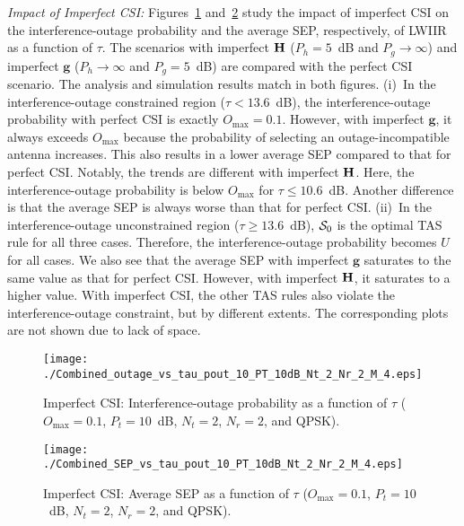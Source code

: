 \documentclass[journal]{IEEEtran}
\newcommand{\tendsto}{\to}
\newcommand{\mtx}[1]{{\bf #1}} %
\newcommand{\Nt}{{N_t}}
\newcommand{\Nr}{{N_r}}
\newcommand{\Pt}{{P_t}}
\newcommand{\puch}{g}
\newcommand{\g}{\mathbf{\puch}}
\newcommand{\outmax}{O_{\text{max}}}
\newcommand{\itau}{\tau}
\newcommand{\un}{U}
\newcommand{\Hmx}{\mtx{H}}
\newcommand{\caluncons}{{\cal S_{\text{0}}}}
\newcommand{\gpilotpower}{P_g}
\newcommand{\hpilotpower}{P_h}
\begin{document}
{\em Impact of Imperfect CSI:} Figures~\ref{fig:out_vs_tau_imp_CSI} and~\ref{fig:sep_vs_tau_imp_CSI} study the impact of imperfect CSI on the interference-outage probability and the average SEP, respectively, of LWIIR as a function of $\tau$. The scenarios with imperfect $\Hmx$ ($\hpilotpower=5$~dB and $\gpilotpower\tendsto\infty$) and imperfect $\g$ ($\hpilotpower\tendsto\infty$ and $\gpilotpower=5$~dB) are compared with the perfect CSI scenario. The analysis and  simulation results match in both figures. (i)~In the interference-outage constrained region ($\itau<13.6$~dB), the interference-outage probability with perfect CSI is exactly $\outmax=0.1$. However, with imperfect $\g$, it always exceeds  $\outmax$ because the probability of selecting an outage-incompatible antenna increases. This also results in a  lower average SEP compared to that for perfect CSI. Notably, the trends are different with imperfect $\Hmx$. Here, the interference-outage probability is below $\outmax$ for $\itau\leq10.6$~dB. Another difference is that the average SEP is always worse than that for perfect CSI. (ii)~In the interference-outage unconstrained region ($\itau \geq 13.6$~dB),  $\caluncons$ is the optimal TAS rule for all three cases. Therefore, the 
interference-outage probability becomes $\un$ for all cases. We also see that the average SEP with imperfect $\g$ saturates to the same value as that for perfect CSI. However, with imperfect $\Hmx$, it saturates to a higher value. With imperfect CSI, the other TAS rules also violate the interference-outage constraint, but by different extents.  The corresponding plots are not shown due to lack of space. 



\begin{figure}
	\centering
	\texttt{[image: ./Combined\_outage\_vs\_tau\_pout\_10\_PT\_10dB\_Nt\_2\_Nr\_2\_M\_4.eps]}
	\caption{Imperfect CSI: Interference-outage probability as a function of $\itau$ ($\outmax=0.1$, $\Pt = 10$~dB, $\Nt = 2$, $\Nr = 2$, and QPSK).}
	\label{fig:out_vs_tau_imp_CSI}
\end{figure}


\begin{figure}
	\centering \texttt{[image: ./Combined\_SEP\_vs\_tau\_pout\_10\_PT\_10dB\_Nt\_2\_Nr\_2\_M\_4.eps]}
	\caption{Imperfect CSI: Average SEP as a function of $\itau$ ($\outmax=0.1$, $\Pt = 10$~dB, $\Nt = 2$, $\Nr = 2$, and QPSK).}
	\label{fig:sep_vs_tau_imp_CSI}
\end{figure}
\end{document}
